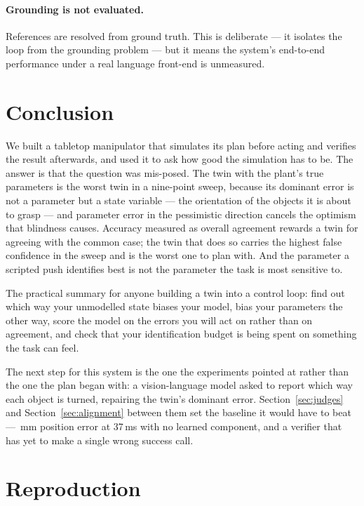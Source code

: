 \documentclass[11pt,a4paper]{article}
\begin{document}
\paragraph{Grounding is not evaluated.} References are resolved from ground truth.
This is deliberate --- it isolates the loop from the grounding problem --- but it
means the system's end-to-end performance under a real language front-end is
unmeasured.

\section{Conclusion}

We built a tabletop manipulator that simulates its plan before acting and
verifies the result afterwards, and used it to ask how good the simulation has to
be. The answer is that the question was mis-posed. The twin with the plant's true
parameters is the worst twin in a nine-point sweep, because its dominant error is
not a parameter but a state variable --- the orientation of the objects it is
about to grasp --- and parameter error in the pessimistic direction cancels the
optimism that blindness causes. Accuracy measured as overall agreement rewards a
twin for agreeing with the common case; the twin that does so carries the highest
false confidence in the sweep and is the worst one to plan with. And the
parameter a scripted push identifies best is not the parameter the task is most
sensitive to.

The practical summary for anyone building a twin into a control loop: find out
which way your unmodelled state biases your model, bias your parameters the other
way, score the model on the errors you will act on rather than on agreement, and
check that your identification budget is being spent on something the task can
feel.

The next step for this system is the one the experiments pointed at rather than
the one the plan began with: a vision-language model asked to report which way
each object is turned, repairing the twin's dominant error. Section~\ref{sec:judges}
and Section~\ref{sec:alignment} between them set the baseline it would have to
beat --- \numSigmaCube\,mm position error at 37\,ms with no learned component, and
a verifier that has yet to make a single wrong success call.

\appendix
\section{Reproduction}
\label{app:repro}
\end{document}
